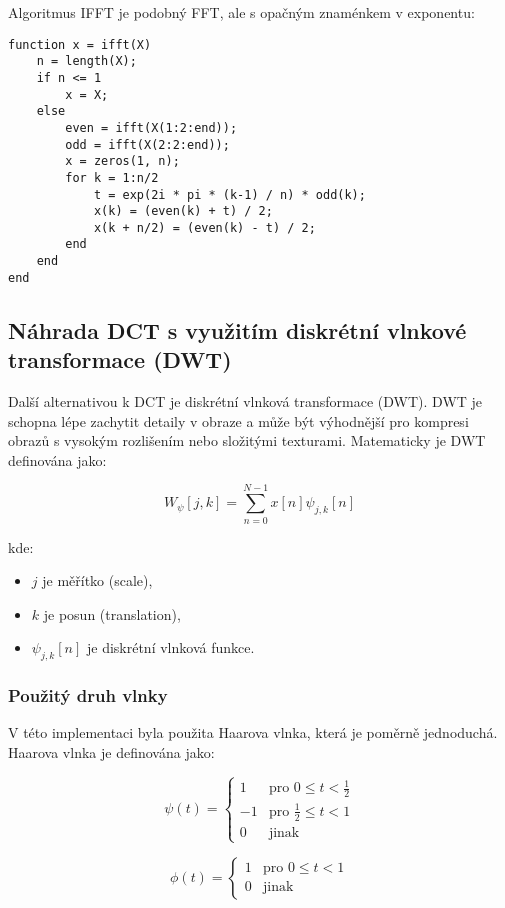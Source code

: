 Algoritmus IFFT je podobný FFT, ale s opačným znaménkem v exponentu:
\begin{verbatim}
function x = ifft(X)
    n = length(X);
    if n <= 1
        x = X;
    else
        even = ifft(X(1:2:end));
        odd = ifft(X(2:2:end));
        x = zeros(1, n);
        for k = 1:n/2
            t = exp(2i * pi * (k-1) / n) * odd(k);
            x(k) = (even(k) + t) / 2;
            x(k + n/2) = (even(k) - t) / 2;
        end
    end
end
\end{verbatim}


\subsection{Náhrada DCT s využitím diskrétní vlnkové transformace (DWT)}

Další alternativou k DCT je diskrétní vlnková transformace (DWT). DWT je schopna lépe zachytit detaily v obraze a může být výhodnější pro kompresi obrazů s vysokým rozlišením nebo složitými texturami.\cite{WaveletWiki} Matematicky je DWT definována jako:

\[
W_{\psi}[j, k] = \sum_{n=0}^{N-1} x[n] \psi_{j,k}[n]
\]

kde:
\begin{itemize}
    \item \(j\) je měřítko (scale),
    \item \(k\) je posun (translation),
    \item \(\psi_{j,k}[n]\) je diskrétní vlnková funkce.
\end{itemize}

\subsubsection{Použitý druh vlnky}
V této implementaci byla použita Haarova vlnka, která je poměrně jednoduchá. Haarova vlnka je definována jako:

\[
\psi(t) = \begin{cases} 
1 & \text{pro } 0 \leq t < \frac{1}{2} \\
-1 & \text{pro } \frac{1}{2} \leq t < 1 \\
0 & \text{jinak}
\end{cases}
\]

\[
\phi(t) = \begin{cases} 
1 & \text{pro } 0 \leq t < 1 \\
0 & \text{jinak}
\end{cases}
\]

